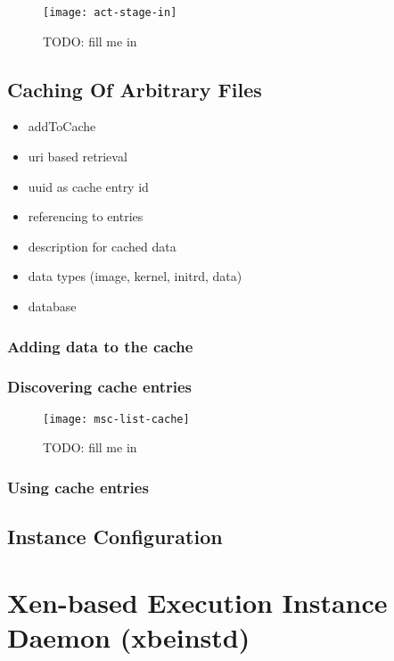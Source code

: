 \begin{figure}[ht]
  \texttt{[image: act-stage-in]}
  \caption[Stage-In Activity]{TODO: fill me in}
  \label{fig:act-stage-in}
\end{figure}


\subsection{Caching Of Arbitrary Files}
\label{sec:caching}

\begin{itemize}
\item addToCache
\item uri based retrieval
\item uuid as cache entry id
\item referencing to entries
\item description for cached data
\item data types (image, kernel, initrd, data)
\item database
\end{itemize}

\subsubsection{Adding data to the cache}

\subsubsection{Discovering cache entries}

\begin{figure}[ht]
  \centering
  \texttt{[image: msc-list-cache]}
  \caption[MSC List Cache Entries]{TODO: fill me in}
  \label{fig:msc-list-cache}
\end{figure}

\subsubsection{Using cache entries}

\subsection{Instance Configuration}

\section[Xen-based Execution Instance Daemon]{Xen-based Execution Instance Daemon (xbeinstd)}
\label{sec:xbeinstd}

